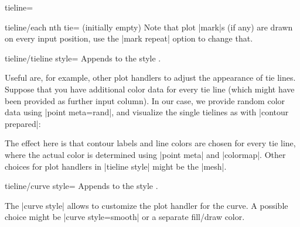 \begin{plottype}{tieline=}
\begin{pgfplotskey}{tieline/each nth tie= (initially empty)}
        Note that plot |mark|s (if any) are drawn on every input position, use
        the |mark repeat| option to change that.
    \end{pgfplotskey}

    \begin{pgfplotskey}{tieline/tieline style=}
        Appends  to the style
        .

        Useful  are, for example, other plot handlers to adjust
        the appearance of tie lines. Suppose that you have additional color
        data for every tie line (which might have been provided as further
        input column). In our case, we provide random color data using
        |point meta=rand|, and visualize the single tielines as with
        |contour prepared|:
\begin{codeexample}[]
\end{codeexample}
        \noindent The effect here is that contour labels and line colors are
        chosen for every tie line, where the actual color is determined using
        |point meta| and |colormap|. Other choices for plot handlers in
        |tieline style| might be the |mesh|.
    \end{pgfplotskey}

    \begin{pgfplotskey}{tieline/curve style=}
        Appends  to the style
        .

        The |curve style| allows to customize the plot handler for the curve. A
        possible choice might be |curve style={smooth}| or a separate fill/draw
        color.
    \end{pgfplotskey}
\end{plottype}
\endgroup

